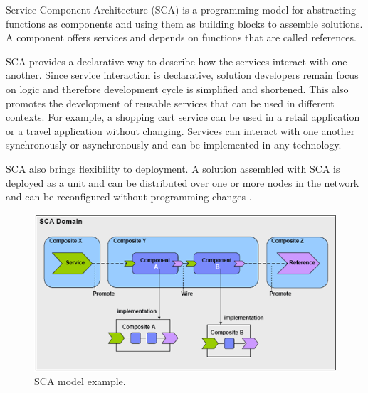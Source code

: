 \documentclass[11pt]{report}
\begin{document}
		\par Service Component Architecture (SCA) is a programming model for abstracting functions as components and using them as building blocks to assemble solutions. A component offers services and depends on functions that are called references.
		\par SCA provides a declarative way to describe how the services interact with one another. Since service interaction is declarative, solution developers remain focus on logic and therefore development cycle is simplified and shortened. This also promotes the development of reusable services that can be used in different contexts. For example, a shopping cart service can be used in a retail application or a travel application without changing. Services can interact with one another synchronously or asynchronously and can be implemented in any technology.
		\par SCA also brings flexibility to deployment. A solution assembled with SCA is deployed as a unit and can be distributed over one or more nodes in the network and can be reconfigured without programming changes \cite{apachetuscany}.
	
		\begin{figure} [H]
			\centering
			\includegraphics[width=0.8\linewidth]{Images/sca}
			\caption{SCA model example\cite{theenterprisearchitect}.}
			\label{fig:sca}
		\end{figure}
		
\end{document}
